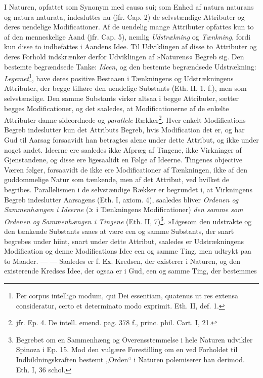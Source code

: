 \documentclass[12pt,a4paper]{book}
\newcommand{\opage}[1]{\marginnote{\footnotesize\textit{[#1]}}}
\begin{document}
I Naturen, opfattet som Synonym med causa sui; som Enhed af
natura naturans og natura naturata, indesluttes nu (jfr. Cap. 2)
de selvstændige Attributer og deres uendelige Modificationer. Af
de uendelig mange Attributer opfattes kun to af den menneskelige
Aand (jfr. Cap. 5), nemlig \emph{Udstrækning} og \emph{Tænkning}, fordi kun
disse to indbefattes i Aandens Idee. Til Udviklingen af disse to
Attributer og deres Forhold indskrænker derfor Udviklingen af
»Naturens« Begreb sig. Den bestemte begrændsede Tanke: \emph{Ideen}, og
den bestemte begrændsede Udstrækning: \emph{Legemet}\footnote{Per corpus
intelligo modum, qui Dei essentiam, quatenus ut res extensa
consideratur, certo et determinato modo exprimit. Eth. II, def.
1.}, have deres positive Bestaaen i Tænkningens og Udstrækningens
Attributer, der begge tilhøre den uendelige Substants (Eth. II,
1. f.), men som selvstændige. Den samme Substants virker altsaa i
begge Attributer, sætter begges Modificationer, og det saaledes,
at Modificationerne af de
\opage{73} \setcounter{footnote}{0}%
enkelte Attributer danne sideordnede og \emph{parallele}
Rækker\footnote{jfr. Ep. 4. De intell. emend. pag. 378 f., princ.
phil. Cart. I, 21.}. Hver enkelt Modifications Begreb indeslutter
kun det Attributs Begreb, hvis Modification det er, og har Gud
til Aarsag forsaavidt han betragtes alene under dette Attribut,
og ikke under noget andet. Ideerne ere saaledes ikke Afpræg af
Tingene, ikke Virkninger af Gjenstandene, og disse ere
ligesaalidt en Følge af Ideerne. Tingenes objective Væren følger,
forsaavidt de ikke ere Modificationer af Tænkningen, ikke af den
guddommelige Natur som tænkende, men af det Attribut, ved hvilket
de begribes. Parallelismen i de selvstændige Rækker er begrundet
i, at Virkningens Begreb indeslutter Aarsagens (Eth. I, axiom.
4), saaledes bliver \emph{Ordenen og Sammenhængen i Ideerne} (ɔ: i
Tænkningens Modificationer) \emph{den samme som Ordenen og
Sammenhængen i Tingene} (Eth. II, 7)\footnote{Begrebet om en
Sammenhæng og Overensstemmelse i hele Naturen udvikler Spinoza i
Ep. 15. Mod den vulgære Forestilling om en ved Forholdet til
Indbildningskraften bestemt „Orden“ i Naturen polemiserer han
derimod. Eth. I, 36 schol.}. »Ligesom den udstrakte og den
tænkende Substants saaes at være een og samme Substants, der
snart begrebes under hiint, snart under dette Attribut, saaledes
er Udstrækningens Modification og denne Modifications Idee een
og samme Ting, men udtrykt paa to Maader. --- --- Saaledes er f.
Ex. Kredsen, der existerer i Naturen, og den existerende Kredses
Idee, der ogsaa er i Gud, een og samme Ting, der bestemmes
\end{document}
